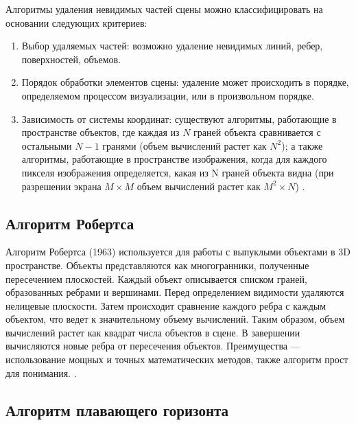 
Алгоритмы удаления невидимых частей сцены можно классифицировать на основании следующих критериев:

\begin{enumerate}
	\item Выбор удаляемых частей: возможно удаление невидимых линий, ребер, поверхностей, объемов.
	\item Порядок обработки элементов сцены: удаление может происходить в порядке, определяемом процессом визуализации, или в произвольном порядке.
	\item Зависимость от системы координат: существуют алгоритмы, работающие в пространстве объектов, где каждая из $N$ граней объекта сравнивается с остальными $N - 1$ гранями (объем вычислений растет как $N^2$); а также алгоритмы, работающие в пространстве изображения, когда для каждого пикселя изображения определяется, какая из N граней объекта видна (при разрешении экрана $M\times{M}$ объем вычислений растет как $M^2 \times N$) \cite{del_line}.
\end{enumerate}

\subsection{Алгоритм Робертса}

Алгоритм Робертса (1963) используется для работы с выпуклыми объектами в 3D пространстве. Объекты представляются как многогранники, полученные пересечением плоскостей. Каждый объект описывается списком граней, образованных ребрами и вершинами. Перед определением видимости удаляются нелицевые плоскости. Затем происходит сравнение каждого ребра с каждым объектом, что ведет к значительному объему вычислений. Таким образом, объем вычислений растет как квадрат числа объектов в сцене. В завершении вычисляются новые ребра от пересечения объектов. Преимущества ---  использование мощных и точных математических методов, также алгоритм прост для понимания. \cite{del_line}. 

\subsection{Алгоритм плавающего горизонта}

